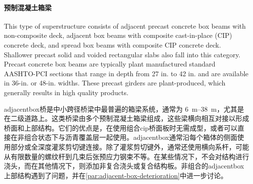\paragraph{预制混凝土箱梁}

This type of superstructure consists of adjacent precast concrete box beams with non-composite deck, adjacent box beams with composite cast-in-place (CIP) concrete deck, and spread box beams with composite CIP concrete deck. Shallower precast solid and voided rectangular slabs also fall into this category. Precast concrete box beams are typically plant manufactured standard AASHTO-PCI sections that range in depth from 27 in. to 42 in. and are available in 36-in. or 48-in. widths. These precast girders are plant-produced, which generally results in high quality products.

\gls*{adjacentbox}桥是中小跨径桥梁中最普遍的箱梁系统，通常为 \qtyrange{6}{38}{m}，尤其是在二级道路上。这类桥梁由多个预制混凝土箱梁组成，这些梁横向相互对接以形成桥面和上部结构。它们的优点是，在使用组合\acrlong*{cip}桥面板时无需成型，或者可以直接在非组合状态下与沥青覆盖层一起使用。\gls*{adjacentbox}通常沿每个箱体的侧面使用部分或全深度灌浆剪切键连接。除了灌浆剪切键外，通常还使用横向系杆，可能从有限数量的螺纹杆到几束后张预应力钢束不等。在某些情况下，不会对结构进行浇头，而在其他情况下，则添加非复合浇头或复合结构板。非组合的\gls*{adjacentbox}上部结构遇到了问题，并在\cref{par:adjacent-box-deterioration}中进一步讨论。

